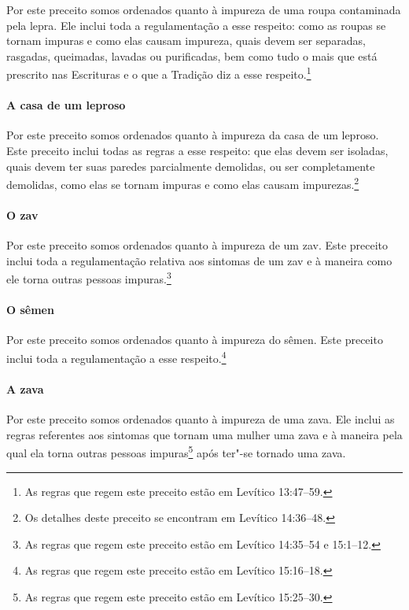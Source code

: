 \begin{multicols}{2}
Por este preceito somos ordenados quanto à impureza de uma roupa
contaminada pela lepra. Ele inclui toda a regulamentação a esse
respeito: como as roupas se tornam impuras e como elas causam impureza,
quais devem ser separadas, rasgadas, queimadas, lavadas ou purificadas, bem
como tudo o mais que está prescrito nas Escrituras e o que a Tradição
diz a esse respeito.\footnote{As regras que regem este preceito estão em Levítico 13:47--59.}

\paragraph{A casa de um leproso}

Por este preceito somos ordenados quanto à impureza da casa de um
leproso. Este preceito inclui todas as regras a esse respeito: que elas
devem ser isoladas, quais devem ter suas paredes parcialmente demolidas,
ou ser completamente demolidas, como elas se tornam impuras e como elas
causam impurezas.\footnote{Os detalhes deste preceito se encontram em Levítico
14:36--48.}

\paragraph{O zav\starr}

Por este preceito somos ordenados quanto à impureza de um zav\starr.
Este preceito inclui toda a regulamentação relativa aos sintomas de um
zav\starr{} e à maneira como ele torna outras pessoas
impuras.\footnote{As regras que regem este preceito estão em Levítico 14:35--54 e
  15:1--12.}

\paragraph{O sêmen}

Por este preceito somos ordenados quanto à impureza do sêmen. Este
preceito inclui toda a regulamentação a esse respeito.\footnote{As regras que regem este preceito estão em Levítico 15:16--18.}

\paragraph{A zava\starr}

Por este preceito somos ordenados quanto à impureza de uma zava\starr.
Ele inclui as regras referentes aos sintomas que tornam uma mulher uma
zava\starr{} e à maneira pela qual ela torna outras pessoas
impuras\footnote{As regras que regem este preceito estão em Levítico 15:25--30.} após ter"-se tornado uma zava\starr.


\end{multicols}
